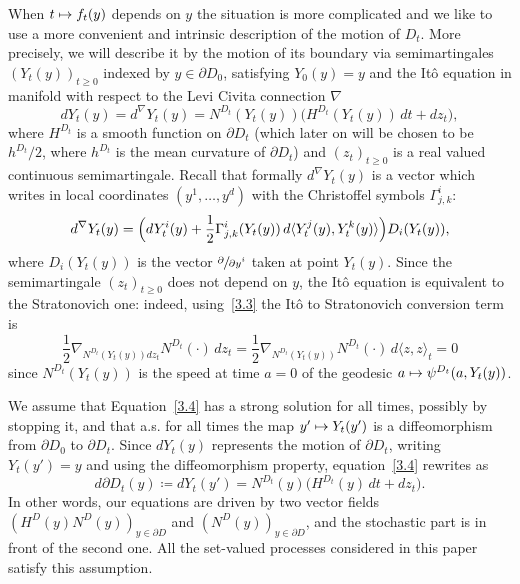 \documentclass[10pt]{amsart}
\newcommand\mto{\mathchoice{\longmapsto}{\mapsto}{\mapsto}{\mapsto}}
\theoremstyle{plain}
\theoremstyle{definition}
\newcommand\df{\coloneqq}
\let\di\displaystyle
\let\f\frac
\let\n\nabla
\let\pa\partial
\begin{document}
When $t\mto f_t(y)$ depends on $y$ the situation is more complicated and we like to use a more convenient and intrinsic description of the motion of $D_t$. More precisely, we will describe it by the motion of its boundary via semimartingales $(Y_t(y))_{t\ge 0}$ indexed by $y\in \partial D_0$, satisfying $Y_0(y)=y$ and the Itô equation in manifold with respect to the Levi Civita connection $\n$
\begin{equation}
\label{3.4}
dY_t(y)=d^\n Y_t(y)=N^{D_t}(Y_t(y))\bigl(H^{D_t}(Y_t(y))\,dt +dz_t\bigr),
\end{equation}
where $H^{D_t}$ is a smooth function on $\partial D_t$ (which later on will be chosen to be $h^{D_t}/2$, where $h^{D_t}$ is the mean curvature of $\pa D_t$) and {$(z_t)_{t\geq 0}$} is a real valued continuous semimartingale.
Recall that formally $d^\n Y_t(y)$ is a vector which writes in local coordinates $(y^1,\ldots, y^d)$ with the Christoffel symbols $\Gamma_{j,k}^i$:
\begin{equation}
d^\n Y_t(y)=\Bigl(dY_t^i(y)+\f12 \Gamma_{j,k}^i(Y_t(y))\, d\langle Y_t^j(y),Y_t^k(y)\rangle \Bigr)D_i(Y_t(y)),
\end{equation}
where $D_i(Y_t(y))$ is the vector $\di \sfrac{\partial}{\partial y^i}$ taken at point $Y_t(y)$.
Since the semimartingale $(z_t)_{t\ge 0}$ does not depend on $y$, the Itô equation is equivalent to the Stratonovich one: indeed, using~\eqref{3.3} the Itô to Stratonovich conversion term is
\[
\f12\n_{N^{D_t}(Y_t(y))dz_t}N^{D_t}(\cdot)\,dz_t=\f12\n_{N^{D_t}(Y_t(y))}N^{D_t}(\cdot)\,d\langle z,z\rangle_t=0
\]
since $N^{D_t}(Y_t(y))$ is the speed at time $a=0$ of the geodesic $a\mto \psi^{D_t}(a,Y_t(y))$.
\par
We assume that Equation~\eqref{3.4} has a strong solution for all times, possibly by stopping it, and that a.s. for all times the map $y'\mto Y_t(y')$ is a diffeomorphism from $\partial D_0$ to $\partial D_t$.
Since $dY_t(y)$ represents the motion of $\partial D_t$, writing $Y_t(y')=y$ and using the diffeomorphism property, equation~\eqref{3.4} rewrites as
\begin{equation}
\label{3.6}
d\partial D_t(y){\df}dY_t(y')=N^{D_t}(y)\bigl(H^{D_t}(y)\, dt +dz_t\bigr).
\end{equation}
In other words, our equations are driven by two vector fields $(H^D(y)N^D(y))_{y\in \partial D}$ and $(N^D(y))_{y\in \partial D}$, and the stochastic part is in front of the second one. All the set-valued processes considered in this paper satisfy this assumption.
\end{document}

